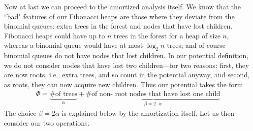 \documentclass[11pt]{article}
\begin{document}
Now at last we can proceed to the amortized analysis itself.
We know that the ``bad" features of our Fibonacci heaps are those where
they deviate from the binomial queues: extra trees in the forest and nodes
that have lost children.  Fibonacci heaps could have up to $n$ trees in the
forest for a heap of size $n$, whereas a binomial queue would have at most
$\log_2 n$ trees; and of course binomial queues do not have nodes that lost
children.  In our potential definition, we do not consider nodes that have
lost two children---for two reasons: first, they are now roots, i.e.,
extra trees, and so count in the potential anyway, and second, as roots,
they can now acquire new children.  Thus our potential takes the form
\begin{align*}
  \Phi = \underbrace{\# \mbox{of trees}}_{\alpha} + \underbrace{\# \mbox{of non-
root nodes that have lost one child}}_{\beta = 2 \cdot \alpha}
\end{align*}
The choice $\beta=2\alpha$ is explained below by the amortization itself.
Let us then consider our two operations.
\end{document}
